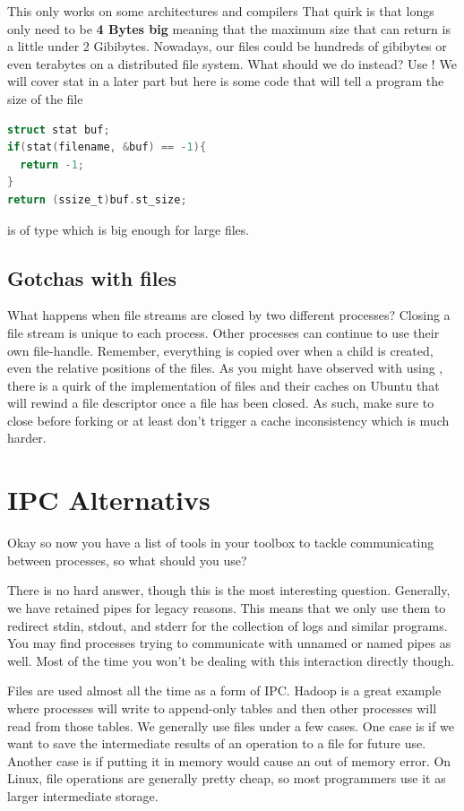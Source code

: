 This only works on some architectures and compilers
That quirk is that longs only need to be \textbf{4 Bytes big} meaning that the maximum size that  can return is a little under 2 Gibibytes.
Nowadays, our files could be hundreds of gibibytes or even terabytes on a distributed file system.
What should we do instead? Use ! We will cover stat in a later part but here is some code that will tell a program the size of the file

\begin{lstlisting}[language=C]
struct stat buf;
if(stat(filename, &buf) == -1){
  return -1;
}
return (ssize_t)buf.st_size;
\end{lstlisting}

 is of type  which is big enough for large files.

\subsection{Gotchas with files}

What happens when file streams are closed by two different processes?
Closing a file stream is unique to each process.
Other processes can continue to use their own file-handle.
Remember, everything is copied over when a child is created, even the relative positions of the files.
As you might have observed with using , there is a quirk of the implementation of files and their caches on Ubuntu that will rewind a file descriptor once a file has been closed.
As such, make sure to close before forking or at least don't trigger a cache inconsistency which is much harder.

\section{IPC Alternativs}

Okay so now you have a list of tools in your toolbox to tackle communicating between processes, so what should you use?

There is no hard answer, though this is the most interesting question.
Generally, we have retained pipes for legacy reasons.
This means that we only use them to redirect stdin, stdout, and stderr for the collection of logs and similar programs.
You may find processes trying to communicate with unnamed or named pipes as well.
Most of the time you won't be dealing with this interaction directly though.

Files are used almost all the time as a form of IPC.
Hadoop is a great example where processes will write to append-only tables and then other processes will read from those tables.
We generally use files under a few cases.
One case is if we want to save the intermediate results of an operation to a file for future use.
Another case is if putting it in memory would cause an out of memory error.
On Linux, file operations are generally pretty cheap, so most programmers use it as larger intermediate storage.


